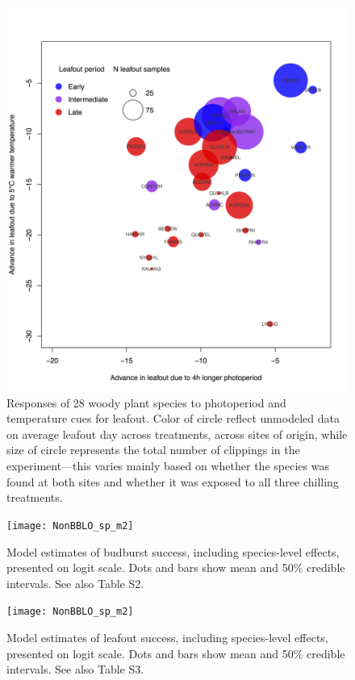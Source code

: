 \documentclass{article}
\begin{document}
\begin{figure} 
\begin{center}
\includegraphics[scale=0.5]{Advplot2.png}
\caption{Responses of 28 woody plant species to photoperiod and temperature cues for leafout. Color of circle reflect unmodeled data on average leafout day across treatments, across sites of origin, while size of circle represents the total number of clippings in the experiment---this varies mainly based on whether the species was found at both sites and whether it was exposed to all three chilling treatments. } %
\label{fig:fig1}
\end{center}
\end{figure}

\begin{figure}
\label{fig:figS8}
\texttt{[image: NonBBLO\_sp\_m2]} %
\caption{Model estimates of budburst success, including species-level effects, presented on logit scale. Dots and bars show mean and 50\% credible intervals. See also Table S2.}
\end{figure}

\begin{figure}
\label{fig:figS9}
\texttt{[image: NonBBLO\_sp\_m2]}
\caption{Model estimates of leafout success, including species-level effects, presented on logit scale. Dots and bars show mean and 50\% credible intervals. See also Table S3.}
\end{figure}
\end{document}
